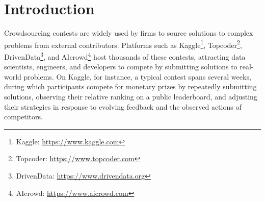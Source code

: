 \documentclass[mnsc]{informs3}
\begin{document}
%


\newpage
\section{Introduction}

Crowdsourcing contests are widely used by firms to source solutions to complex problems from external contributors.
Platforms such as Kaggle\footnote{Kaggle: \url{https://www.kaggle.com}}, Topcoder\footnote{Topcoder: \url{https://www.topcoder.com}}, DrivenData\footnote{DrivenData: \url{https://www.drivendata.org}}, and AIcrowd\footnote{AIcrowd: \url{https://www.aicrowd.com}} host thousands of these contests, attracting data scientists, engineers, and developers to compete by submitting solutions to real-world problems.
On Kaggle, for instance, a typical contest spans several weeks, during which participants compete for monetary prizes by repeatedly submitting solutions, observing their relative ranking on a public leaderboard, and adjusting their strategies in response to evolving feedback and the observed actions of competitors.
\end{document}
